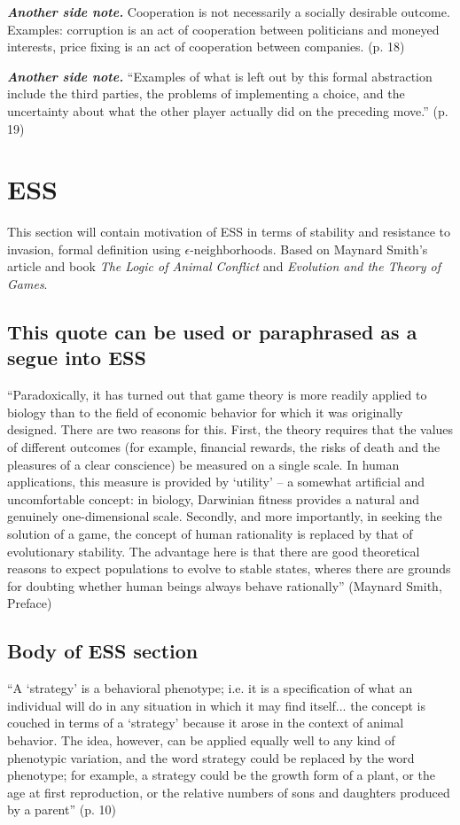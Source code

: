 \textit{\textbf{Another side note.}} Cooperation is not necessarily a socially desirable outcome. Examples: corruption is an act of cooperation between politicians and moneyed interests, price fixing is an act of cooperation between companies. (p. 18)

\textit{\textbf{Another side note.}} ``Examples of what is left out by this formal abstraction include the third parties, the problems of implementing a choice, and the uncertainty about what the other player actually did on the preceding move.'' (p. 19)

\section{ESS}
This section will contain motivation of ESS in terms of stability and resistance to invasion, formal definition using $\epsilon$-neighborhoods. Based on Maynard Smith's article and book \emph{The Logic of Animal Conflict} and \emph{Evolution and the Theory of Games}.

\subsection{This quote can be used or paraphrased as a segue into ESS}
``Paradoxically, it has turned out that game theory is more readily applied to biology than to the field of economic behavior for which it was originally designed. There are two reasons for this. First, the theory requires that the values of different outcomes (for example, financial rewards, the risks of death and the pleasures of a clear conscience) be measured on a single scale. In human applications, this measure is provided by `utility' -- a somewhat artificial and uncomfortable concept: in biology, Darwinian fitness provides a natural and genuinely one-dimensional scale. Secondly, and more importantly, in seeking the solution of a game, the concept of human rationality is replaced by that of evolutionary stability. The advantage here is that there are good theoretical reasons to expect populations to evolve to stable states, wheres there are grounds for doubting whether human beings always behave rationally'' (Maynard Smith, Preface)


\subsection{Body of ESS section}
``A `strategy' is a behavioral phenotype; i.e. it is a specification of what an individual will do in any situation in which it may find itself... the concept is couched in terms of a `strategy' because it arose in the context of animal behavior. The idea, however, can be applied equally well to any kind of phenotypic variation, and the word strategy could be replaced by the word phenotype; for example, a strategy could be the growth form of a plant, or the age at first reproduction, or the relative numbers of sons and daughters produced by a parent'' (p. 10)

